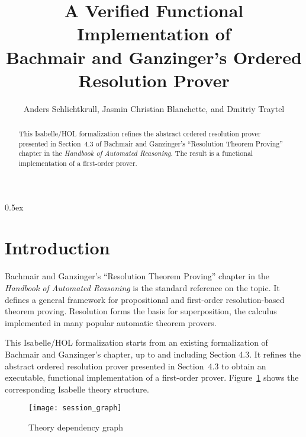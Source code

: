 \documentclass[10pt,a4paper]{article}
\begin{document}
\title{A Verified Functional Implementation of \\ Bachmair and Ganzinger's Ordered Resolution Prover}
\author{Anders Schlichtkrull, Jasmin Christian Blanchette, and Dmitriy Traytel}

\maketitle

\begin{abstract}
\noindent
This Isabelle/HOL formalization refines the abstract ordered resolution prover
presented in Section~4.3 of Bachmair and Ganzinger's ``Resolution Theorem
Proving'' chapter in the \emph{Handbook of Automated Reasoning}. The result
is a functional implementation of a first-order prover.
\end{abstract}

\tableofcontents

\parindent 0pt
\parskip 0.5ex

\section{Introduction}

Bachmair and Ganzinger's ``Resolution Theorem Proving'' chapter
in the \emph{Handbook of Automated Reasoning} is the standard reference on the
topic. It defines a general framework for propositional and first-order
resolution-based theorem proving. Resolution forms the basis for
superposition, the calculus implemented in many popular automatic theorem
provers.

\medskip

This Isabelle/HOL formalization starts from an existing formalization of
Bachmair and Ganzinger's chapter, up to and including Section 4.3. It refines
the abstract ordered resolution prover presented in Section~4.3 to obtain an
executable, functional implementation of a first-order prover.
Figure~\ref{fig:thys} shows the corresponding Isabelle theory structure.

\begin{figure}
\begin{center}
  \texttt{[image: session\_graph]}
\end{center}
\caption{Theory dependency graph}
\label{fig:thys}
\end{figure}



% 
% 
\end{document}
